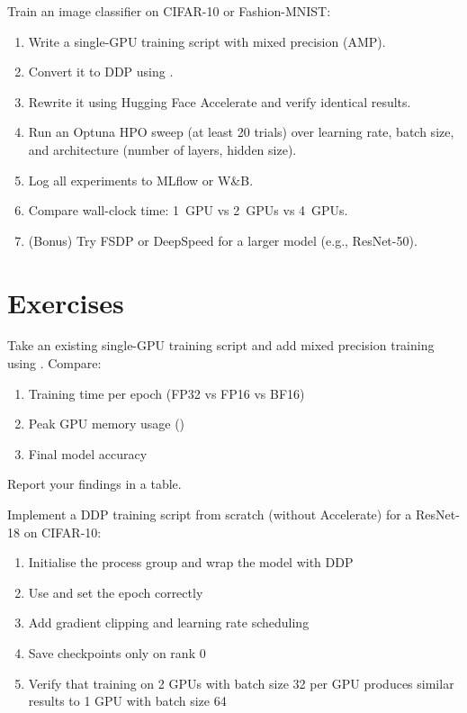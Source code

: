 \begin{miniproject}[title=\textbf{Mini-project 6: Multi-GPU training}]
Train an image classifier on CIFAR-10 or Fashion-MNIST:
\begin{enumerate}
  \item Write a single-GPU training script with mixed precision (AMP).
  \item Convert it to DDP using .
  \item Rewrite it using Hugging Face Accelerate and verify identical
    results.
  \item Run an Optuna HPO sweep (at least 20 trials) over learning rate,
    batch size, and architecture (number of layers, hidden size).
  \item Log all experiments to MLflow or W\&B.
  \item Compare wall-clock time: 1~GPU vs 2~GPUs vs 4~GPUs.
  \item (Bonus) Try FSDP or DeepSpeed for a larger model
    (e.g., ResNet-50).
\end{enumerate}
\end{miniproject}

\section{Exercises}
\label{sec:exercises-ch6}

\begin{exercise}
Take an existing single-GPU training script and add mixed precision
training using . Compare:
\begin{enumerate}
  \item Training time per epoch (FP32 vs FP16 vs BF16)
  \item Peak GPU memory usage ()
  \item Final model accuracy
\end{enumerate}
Report your findings in a table.
\end{exercise}

\begin{exercise}
Implement a DDP training script from scratch (without Accelerate) for a
ResNet-18 on CIFAR-10:
\begin{enumerate}
  \item Initialise the process group and wrap the model with DDP
  \item Use  and set the epoch correctly
  \item Add gradient clipping and learning rate scheduling
  \item Save checkpoints only on rank 0
  \item Verify that training on 2 GPUs with batch size 32 per GPU produces
    similar results to 1 GPU with batch size 64
\end{enumerate}
\end{exercise}

